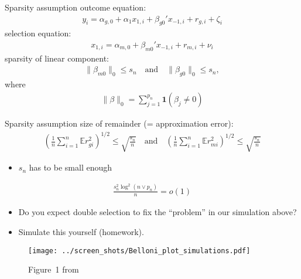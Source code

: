 \documentclass[xcolor=dvipsnames]{beamer}
\newcommand{\E}{\mathbb{E}}
\begin{document}
\begin{frame}{Sparsity assumption}
outcome equation:
\begin{align*}
  y_i = \alpha_{g, 0} + \alpha_1 x_{1,i} + \beta_{g0}' x_{-1, i} + r_{g, i} + \zeta_i
\end{align*}
selection equation: 
\begin{align*}
  x_{1, i} = \alpha_{m, 0} + \beta_{m0}' x_{-1, i} + r_{m, i} + \nu_i
\end{align*}
sparsity of linear component: 
\begin{align*}
  \lVert \beta_{m0} \rVert_0 \leq s_n \quad \text{and} \quad \lVert \beta_{g0} \rVert_0 \leq s_n,
\end{align*}
where 
\begin{align*}
  \lVert \beta \rVert_0 = \sum_{j = 1}^{p_n} \mathbf{1}(\beta_j \neq 0)
\end{align*}
\end{frame}


\begin{frame}{Sparsity assumption}
size of remainder (= approximation error): 
\begin{align*}
  \left(\frac{1}{n} \sum_{i=1}^n \E{} r_{gi}^2\right)^{1/2} \leq \sqrt{\frac{s_n}{n}} 
  \quad \text{and} \quad 
  \left(\frac{1}{n} \sum_{i=1}^n \E{} r_{mi}^2\right)^{1/2} \leq \sqrt{\frac{s_n}{n}}
\end{align*}
\begin{itemize}
  \item $s_n$ has to be small enough
\end{itemize}
\begin{align*}
  \frac{s_n^2 \log^2 (n \vee p_n)}{n} = o(1) 
\end{align*}

\end{frame}


\begin{frame}
  \begin{itemize}
    \item Do you expect double selection to fix the ``problem'' in our simulation above?
    \item Simulate this yourself (homework). 
  \end{itemize}
\end{frame}

\begin{frame}
\begin{figure}
  \texttt{[image: ../screen\_shots/Belloni\_plot\_simulations.pdf]}
   \caption{Figure~1 from \textcite{belloni2014inference}}
\end{figure}
\end{frame}
\end{document}
